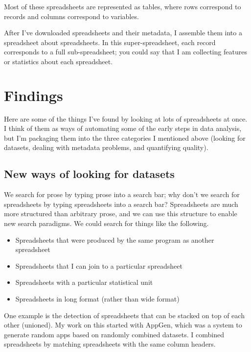 \documentclass{acm_proc_article-sp}
\begin{document}
Most of these spreadsheets are represented as tables,
where rows correspond to records and columns correspond to variables.\cite{table}

After I've downloaded spreadsheets and their metadata,
I assemble them into a spreadsheet about spreadsheets.\cite{data-driven}
In this super-spreadsheet, each record corresponds to a full
sub-spreadsheet; you could say that I am collecting features or statistics
about each spreadsheet.

\section{Findings}
Here are some of the things I've found by looking at lots of spreadsheets at
once. I think of them as ways of automating some of the early steps in data
analysis, but I'm packaging them into the three categories I mentioned above
(looking for datasets, dealing with metadata problems, and quantifying quality).

\subsection{New ways of looking for datasets}
We search for prose by typing prose into a search bar; why don't
we search for spreadsheets by typing spreadsheets into a search bar?
Spreadsheets are much more structured than arbitrary prose, and we
can use this structure to enable new search paradigms. We could search
for things like the following.

\begin{itemize}
\item Spreadsheets that were produced by the same program as another spreadsheet
\item Spreadsheets that I can join to a particular spreadsheet
\item Spreadsheets with a particular statistical unit
\item Spreadsheets in long format (rather than wide format)
\end{itemize}

One example is the detection of spreadsheets that can be stacked on top of
each other (unioned).
My work on this started with AppGen,\cite{appgen} which was a system to
generate random apps based on randomly combined datasets. I combined spreadsheets
by matching spreadsheets with the same column headers.
\end{document}
